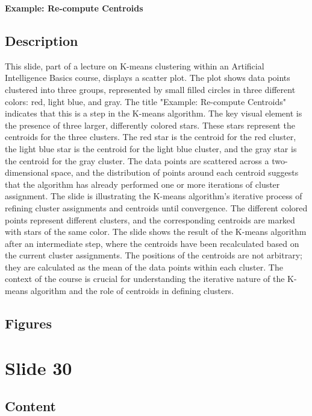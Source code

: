 \documentclass{article}%
\begin{document}
\textbf{Example: Re-compute Centroids}
%
\subsection{Description}%
This slide, part of a lecture on K-means clustering within an Artificial Intelligence Basics course, displays a scatter plot.  The plot shows data points clustered into three groups, represented by small filled circles in three different colors: red, light blue, and gray.  The title "Example: Re-compute Centroids" indicates that this is a step in the K-means algorithm.  The key visual element is the presence of three larger, differently colored stars. These stars represent the centroids for the three clusters.  The red star is the centroid for the red cluster, the light blue star is the centroid for the light blue cluster, and the gray star is the centroid for the gray cluster.  The data points are scattered across a two-dimensional space, and the distribution of points around each centroid suggests that the algorithm has already performed one or more iterations of cluster assignment.  The slide is illustrating the K-means algorithm's iterative process of refining cluster assignments and centroids until convergence.  The different colored points represent different clusters, and the corresponding centroids are marked with stars of the same color.  The slide shows the result of the K-means algorithm after an intermediate step, where the centroids have been recalculated based on the current cluster assignments.  The positions of the centroids are not arbitrary; they are calculated as the mean of the data points within each cluster.  The context of the course is crucial for understanding the iterative nature of the K-means algorithm and the role of centroids in defining clusters.%
\subsection{Figures}%
\begin{figure}[H]%
\centering%
\end{figure}

%
\newpage%
\section{Slide 30}%
\label{sec:Slide30}%
\subsection{Content}%
\end{document}
